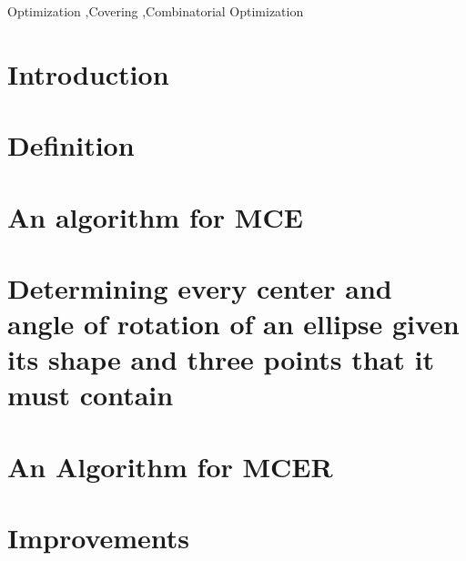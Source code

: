 \documentclass[3p, 11pt]{elsarticle}
\begin{document}
\begin{frontmatter}
		\begin{keyword}
			Optimization \sep Covering \sep Combinatorial Optimization
			
			
		\end{keyword}
		
	\end{frontmatter}
	

\section{Introduction}\label{section:introduction}



\section{Definition}\label{section:definition}


\section{An algorithm for MCE}\label{section:mce}



\section{Determining every center and angle of rotation of an ellipse given its shape and three points that it must contain}\label{section:e3p}
	


\section{An Algorithm for MCER}\label{section:mcer}



\section{Improvements}\label{section:improvements}


%
\end{document}
